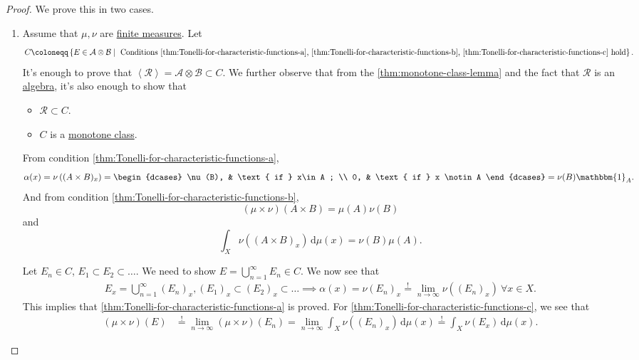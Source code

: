 \begin{proof}
	We prove this in two cases.
	\begin{enumerate}
		\item Assume that \(\mu , \nu \) are \hyperref[def:finite-measure]{finite measures}. Let
		      \[
			      C \coloneqq \left\{E\in \mathcal{A} \otimes \mathcal{B} \mid \text{ Conditions \autoref{thm:Tonelli-for-characteristic-functions-a}, \autoref{thm:Tonelli-for-characteristic-functions-b}, \autoref{thm:Tonelli-for-characteristic-functions-c} hold} \right\}.
		      \]
		      It's enough to prove that \(\left< \mathcal{R}  \right> = \mathcal{A} \otimes \mathcal{B} \subset C\). We further observe that from the \autoref{thm:monotone-class-lemma} and the fact that \(\mathcal{R} \) is an \hyperref[def:algebra]{algebra}, it's also enough to show that
		      \begin{itemize}
			      \item \(\mathcal{R} \subset C\).
			      \item \(C\) is a \hyperref[def:monotone-class]{monotone class}.
		      \end{itemize}
		      From condition \autoref{thm:Tonelli-for-characteristic-functions-a},
		      \[
			      \alpha (x) = \nu \left((A\times B)_x\right) = \begin{dcases}
				      \nu (B), & \text{ if } x\in A ;   \\
				      0,       & \text{ if } x \notin A
			      \end{dcases} = \nu (B)\mathbbm{1}_{A}.
		      \]
		      And from condition \autoref{thm:Tonelli-for-characteristic-functions-b},
		      \[
			      (\mu \times \nu )(A\times B) = \mu (A)\nu (B)
		      \]
		      and
		      \[
			      \int _X \nu ((A\times B)_x)\,\mathrm{d} \mu (x) = \nu (B)\mu (A).
		      \]

		      Let \(E_{n} \in C\), \(E_1\subset E_{2}\subset \dots\). We need to show \(E = \bigcup_{n=1}^{\infty} E_{n} \in C\). We now see that
		      \[
			      \begin{split}
				      E_{x}  = \bigcup_{n=1}^{\infty} (E_{n} )_x, (E_1)_x\subset (E_2)_x\subset \dots
				      \implies \alpha (x) = \nu (E_n)_x \overset{\hyperref[thm:measure-space-continuity-from-below]{!}}{=} \lim_{n \to \infty} \nu ((E_n)_x)\ \forall x\in X.
			      \end{split}
		      \]
		      This implies that \autoref{thm:Tonelli-for-characteristic-functions-a} is proved. For \autoref{thm:Tonelli-for-characteristic-functions-c}, we see that
		      \[
			      \begin{split}
				      (\mu \times \nu )(E)
				       & \overset{\hyperref[thm:measure-space-continuity-from-below]{!}}{=}\lim_{n \to \infty} (\mu \times \nu )(E_{n} )
				      = \lim_{n \to \infty} \int _X \nu ((E_{n})_x) \,\mathrm{d} \mu (x)
				      \overset{\hyperref[thm:MCT]{!}}{=} \int _X \nu (E_{x} )\,\mathrm{d} \mu (x).
			      \end{split}
		      \]


\end{enumerate}
\end{proof}
